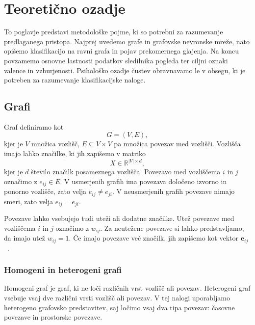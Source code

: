 \chapter{Teoretično ozadje}
\label{sec:ozadje}

To poglavje predstavi metodološke pojme, ki so potrebni za razumevanje predlaganega pristopa.
Najprej uvedemo grafe in grafovske nevronske mreže, nato opišemo klasifikacijo na ravni grafa in pojav prekomernega glajenja.
Na koncu povzamemo osnovne lastnosti podatkov sledilnika pogleda ter ciljni oznaki valence in vzburjenosti.
Psihološko ozadje čustev obravnavamo le v obsegu, ki je potreben za razumevanje klasifikacijske naloge.

\section{Grafi}
\label{subsec:grafi}

Graf definiramo kot
\begin{equation}
    G = (V, E),
\end{equation}
kjer je $V$ množica vozlišč, $E \subseteq V \times V$ pa množica povezav med vozlišči.
Vozlišča imajo lahko značilke, ki jih zapišemo v matriko
\begin{equation}
    X \in \mathbb{R}^{|V| \times d},
\end{equation}
kjer je $d$ število značilk posameznega vozlišča.
Povezavo med vozliščema $i$ in $j$ označimo z $e_{ij} \in E$.
V usmerjenih grafih ima povezava določeno izvorno in ponorno vozlišče, zato velja $e_{ij} \ne e_{ji}$.
V neusmerjenih grafih povezave nimajo smeri, zato velja $e_{ij} = e_{ji}$.

Povezave lahko vsebujejo tudi uteži ali dodatne značilke.
Utež povezave med vozliščema $i$ in $j$ označimo z $w_{ij}$.
Za neutežene povezave si lahko predstavljamo, da imajo utež $w_{ij}=1$.
Če imajo povezave več značilk, jih zapišemo kot vektor $\mathbf{e}_{ij}$~\cite{ref_graphs}.

\subsection{Homogeni in heterogeni grafi}

Homogeni graf je graf, ki ne loči različnih vrst vozlišč ali povezav.
Heterogeni graf vsebuje vsaj dve različni vrsti vozlišč ali povezav.
V tej nalogi uporabljamo heterogeno grafovsko predstavitev, saj ločimo vsaj dva tipa povezav: časovne povezave in prostorske povezave.

